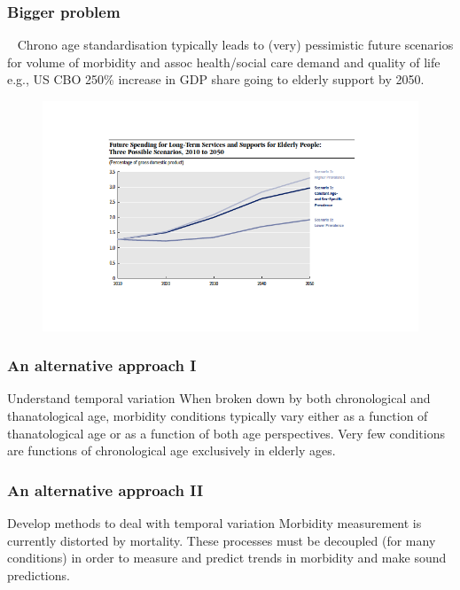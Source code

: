 \documentclass[20pt]{beamer}
\begin{document}
\begin{frame}
\frametitle{Bigger problem}
\vspace{1em}
\begin{block}{~}
Chrono age standardisation typically leads to (very) pessimistic future
scenarios for volume of morbidity and assoc health/social care demand and
quality of life e.g., US CBO 250\% increase in GDP share going to elderly
support by 2050.
\end{block}
\vspace{-2em}
\begin{figure}[b]
    \centering
    \includegraphics[scale=.9]{Figures/Johnsfig2.png}
\end{figure} 
\end{frame}

\begin{frame}
\frametitle{An alternative approach I}
\begin{block}{Understand temporal variation}
When broken down by both chronological and thanatological age, morbidity
conditions typically vary either as a function of thanatological age or as a
function of both age perspectives. Very few conditions are functions of
chronological age exclusively in elderly ages.
\end{block}

\end{frame}
\begin{frame}
\frametitle{An alternative approach II}
\begin{block}{Develop methods to deal with temporal variation}
Morbidity measurement is currently distorted by mortality. These
processes must be decoupled (for many conditions) in order to measure and
predict trends in morbidity and make sound predictions.
\end{block}
\end{frame}
\end{document}
